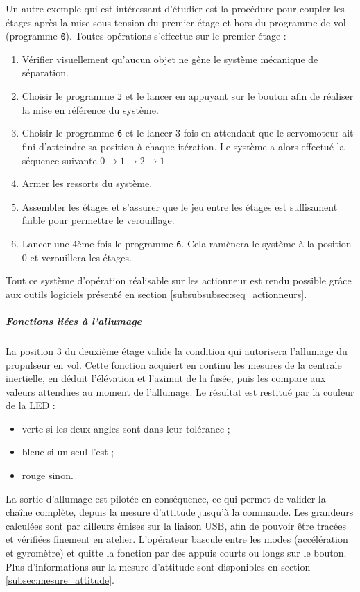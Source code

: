 \vspace{0.2cm}

\noindent Un autre exemple qui est intéressant d'étudier est la procédure pour coupler les étages après la mise sous tension du
premier étage et hors du programme de vol (programme \texttt{0}). Toutes opérations s'effectue sur le premier étage :
\begin{enumerate}
	\item Vérifier visuellement qu'aucun objet ne gêne le système mécanique de séparation. 
	\item Choisir le programme \texttt{3} et le lancer en appuyant sur le bouton afin de réaliser la mise en référence du
	système.
	\item Choisir le programme \texttt{6} et le lancer 3 fois en attendant que le servomoteur ait fini d'atteindre sa position
	à chaque itération. Le système a alors effectué la séquence suivante $0 \longrightarrow 1 \longrightarrow 2 \longrightarrow 1$
	\item Armer les ressorts du système.
	\item Assembler les étages et s'assurer que le jeu entre les étages est suffisament faible pour permettre le verouillage.
	\item Lancer une 4ème fois le programme \texttt{6}. Cela ramènera le système à la position 0 et verouillera les étages.
\end{enumerate}

Tout ce système d'opération réalisable sur les actionneur est rendu possible grâce aux outils logiciels présenté en section
\ref{subsubsubsec:seq_actionneurs}.

\vfill

\subparagraph*{Fonctions liées à l'allumage} La position 3 du deuxième étage valide la condition qui autorisera l'allumage du
propulseur en vol. Cette fonction acquiert en continu les mesures de la centrale inertielle, en déduit l'élévation et l'azimut
de la fusée, puis les compare aux valeurs attendues au moment de l'allumage. Le résultat est restitué par la couleur de la LED :
\begin{itemize}
	\item verte si les deux angles sont dans leur tolérance ;
	\item bleue si un seul l'est ;
	\item rouge sinon.
\end{itemize}
La sortie d'allumage est pilotée en conséquence, ce qui permet de valider la chaîne complète, depuis la mesure d'attitude jusqu'à
la commande. Les grandeurs calculées sont par ailleurs émises sur la liaison \acrshort{USB}, afin de pouvoir être tracées et
vérifiées finement en atelier. L'opérateur bascule entre les modes (accélération et gyromètre) et quitte la fonction par des
appuis courts ou longs sur le bouton. Plus d'informations sur la mesure d'attitude sont disponibles en section
\ref{subsec:mesure_attitude}.\\

